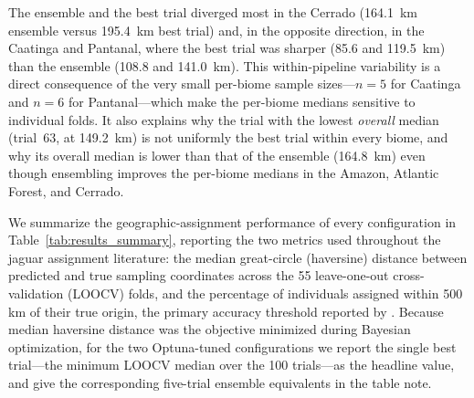 \documentclass[twocolumn,10pt]{article}
\begin{document}
The ensemble and the best trial diverged most in the Cerrado (164.1~km ensemble versus 195.4~km best
trial) and, in the opposite direction, in the Caatinga and Pantanal, where the best trial was
sharper (85.6 and 119.5~km) than the ensemble (108.8 and 141.0~km). This within-pipeline variability
is a direct consequence of the very small per-biome sample sizes---$n=5$ for Caatinga and $n=6$ for
Pantanal---which make the per-biome medians sensitive to individual folds. It also explains why the
trial with the lowest \emph{overall} median (trial~63, at 149.2~km) is not uniformly the best trial
within every biome, and why its overall median is lower than that of the ensemble (164.8~km) even
though ensembling improves the per-biome medians in the Amazon, Atlantic Forest, and Cerrado.

We summarize the geographic-assignment performance of every configuration in
Table~\ref{tab:results_summary}, reporting the two metrics used throughout the jaguar assignment
literature: the median great-circle (haversine) distance between predicted and true sampling
coordinates across the 55 leave-one-out cross-validation (LOOCV) folds, and the percentage of
individuals assigned within 500\,km of their true origin, the primary accuracy threshold reported by
\citet{lazzari2025development}. Because median haversine distance was the objective minimized during
Bayesian optimization, for the two Optuna-tuned configurations we report the single best trial---the
minimum LOOCV median over the 100 trials---as the headline value, and give the corresponding
five-trial ensemble equivalents in the table note.
\end{document}
